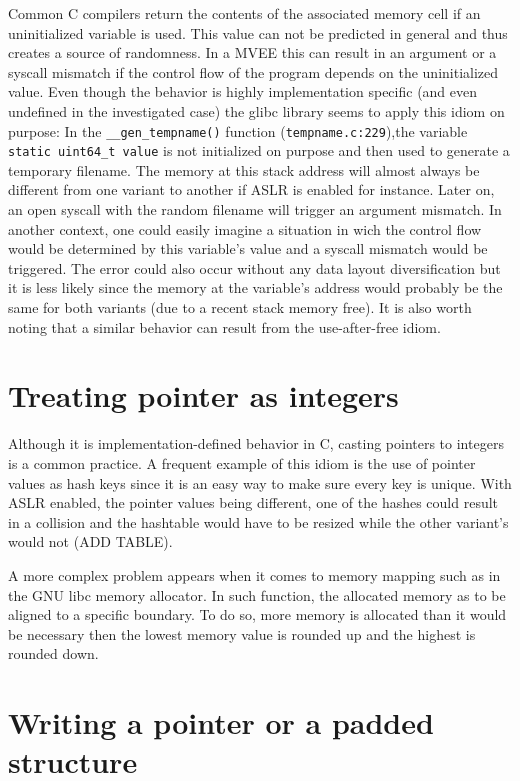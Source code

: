 \documentclass[english]{enstaPRE}
\begin{document}
Common C compilers return the contents of the associated memory cell if an uninitialized variable is used.
This value can not be predicted in general and thus creates a source of randomness. In a MVEE this can result in an argument or a syscall mismatch if the
control flow of the program depends on the uninitialized value.
Even though the behavior is highly implementation specific (and even undefined in the investigated case) the glibc library seems to apply 
this idiom on purpose: In the \texttt{\_\_gen\_tempname()} function (\texttt{tempname.c:229}),the variable \texttt{static uint64\_t value}
is not initialized on purpose and then used to generate a temporary filename.
The memory at this stack address will almost always be different from one variant to another if ASLR is enabled for instance.
Later on, an open syscall with the random filename will trigger an argument mismatch. In another context, one could easily imagine
a situation in wich the control flow would be determined by this variable’s value and a syscall mismatch would be triggered.
The error could also occur without any data layout diversification but it is less likely since the memory at the variable’s address would
probably be the same for both variants (due to a recent stack memory free).
It is also worth noting that a similar behavior can result from the use-after-free idiom.

\section{Treating pointer as integers}

Although it is implementation-defined behavior in C, casting pointers to integers is a common practice.
A frequent example of this idiom is the use of pointer values as hash keys since it is an easy way to make sure every key is unique. With ASLR enabled,
the pointer values being different, one of the hashes could result in a collision and the hashtable would have to be resized while
the other variant’s would not (ADD TABLE).

A more complex problem appears when it comes to memory mapping such as in the GNU libc memory allocator.
In such function, the allocated memory as to be aligned to a specific boundary. To do so, more memory is allocated than it would be 
necessary then the lowest memory value is rounded up and the highest is rounded down.



\section{Writing a pointer or a padded structure}
\end{document}
